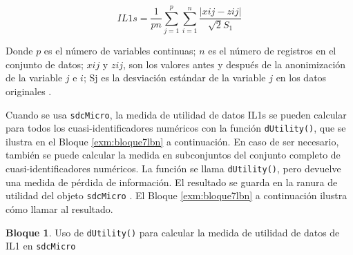 \documentclass[]{book}
\newenvironment{Shaded}{\begin{snugshade}}{\end{snugshade}}
\newcommand{\CommentTok}[1]{\textcolor[rgb]{0.56,0.35,0.01}{\textit{#1}}}
\newcommand{\DataTypeTok}[1]{\textcolor[rgb]{0.13,0.29,0.53}{#1}}
\newcommand{\KeywordTok}[1]{\textcolor[rgb]{0.13,0.29,0.53}{\textbf{#1}}}
\newcommand{\NormalTok}[1]{#1}
\newcommand{\OperatorTok}[1]{\textcolor[rgb]{0.81,0.36,0.00}{\textbf{#1}}}
\newcommand{\StringTok}[1]{\textcolor[rgb]{0.31,0.60,0.02}{#1}}
\theoremstyle{definition}
\theoremstyle{definition}
\newtheorem{example}{Bloque}[chapter]
\theoremstyle{definition}
\theoremstyle{definition}
\theoremstyle{remark}
\begin{document}
\[IL1s=\frac{1}{pn}\sum_{j=1}^{p} \sum_{i=1}^{n} \frac{|xij−zij|} {\sqrt2S_1} \]

Donde \(p\) es el número de variables continuas; \(n\) es el número de registros en el conjunto de datos; \(xij\) y \(zij\), son los valores antes y después de la anonimización de la variable \(j\) e \(i\); Sj es la desviación estándar de la variable \(j\) en los datos originales \citep{yancey2002}.

Cuando se usa \texttt{sdcMicro}, la medida de utilidad de datos IL1s se pueden calcular para todos los cuasi-identificadores numéricos con la función \texttt{dUtility()}, que se ilustra en el Bloque \ref{exm:bloque7lbn} a
continuación. En caso de ser necesario, también se puede calcular la medida en subconjuntos del conjunto completo de cuasi-identificadores numéricos. La función se llama \texttt{dUtility()}, pero devuelve una medida de pérdida de información. El resultado se guarda en la ranura de utilidad del objeto \texttt{sdcMicro} . El Bloque \ref{exm:bloque7lbn} a continuación ilustra cómo llamar al resultado.

\begin{example}
\protect\hypertarget{exm:bloque7lbn}{}{\label{exm:bloque7lbn} }Uso de \texttt{dUtility()} para calcular la medida de utilidad de datos de IL1 en \texttt{sdcMicro}
\end{example}

\begin{Shaded}
\end{Shaded}
\end{document}
